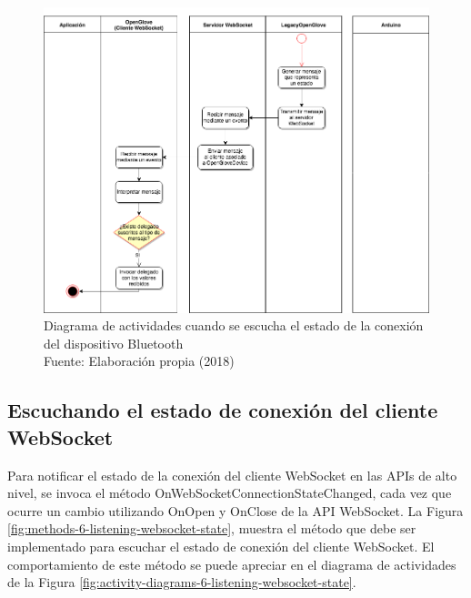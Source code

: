 \begin{figure}[H]
  \begin{center} 
   	\includegraphics[width=1.0\textwidth]{images/chapter04/ActivityDiagrams-ListeningMessagesFromOpenGloveDevice.png} 
   	\captionsetup{justification=centering}
    \caption[Diagrama de actividades cuando se escucha el estado de la conexión del dispositivo Bluetooth]{Diagrama de actividades cuando se escucha el estado de la conexión del dispositivo Bluetooth\\Fuente: Elaboración propia (2018)}
    \label{fig:activity-diagrams-5-listening-bluetoothdevice-state}
  \end{center}
\end{figure}


\subsection{Escuchando el estado de conexión del cliente WebSocket}
\label{subsection:listening-openglove-arduino}
Para notificar el estado de la conexión del cliente WebSocket en las APIs de alto nivel, se invoca el método OnWebSocketConnectionStateChanged, cada vez que ocurre un cambio utilizando OnOpen y OnClose de la API WebSocket. La Figura \ref{fig:methods-6-listening-websocket-state}, muestra el método que debe ser implementado para escuchar el estado de conexión del cliente WebSocket. El comportamiento de este método se puede apreciar en el diagrama de actividades de la Figura \ref{fig:activity-diagrams-6-listening-websocket-state}.


